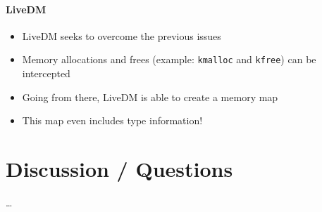 \documentclass{i20lecture}
\begin{document}
\begin{frame}{\insertsection}
  \framesubtitle{LiveDM}
  
  \begin{itemize}
    \item LiveDM seeks to overcome the previous issues
\pause
    \item Memory allocations and frees (example: \texttt{kmalloc} and \texttt{kfree}) can be intercepted
\pause
    \item Going from there, LiveDM is able to create a memory map
\pause
    \item This map even includes type information!
  \end{itemize}
\end{frame}


\section{Discussion / Questions}
\begin{frame}{\insertsection}
  \begin{center}
    \LARGE \dots
  \end{center}
\end{frame}
\end{document}

